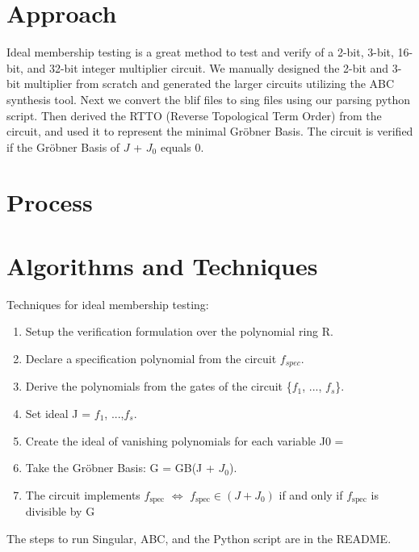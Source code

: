 \documentclass[conference]{IEEEtran}
\begin{document}
\section{Approach}
Ideal membership testing is a great method to test and verify of a 2-bit, 3-bit, 16-bit, and 32-bit integer multiplier circuit.
We manually designed the 2-bit and 3-bit multiplier from scratch and generated the larger circuits utilizing the ABC synthesis tool. Next we
convert the blif files to sing files using our parsing python script. Then derived the RTTO (Reverse Topological Term Order) from the circuit, and used it to
represent the minimal Gröbner Basis. The circuit is verified if the Gröbner Basis of $J$ + $J_{0}$ equals 0.

\section{Process}

\section{Algorithms and Techniques}
Techniques for ideal membership testing: 
\begin{enumerate}
    \item Setup the verification formulation over the polynomial ring R. 
    \item Declare a specification polynomial from the circuit $f_{spec}$.
    \item Derive the polynomials from the gates of the circuit \{$f_{1}$, ..., $f_{s}$\}. 
    \item Set ideal J = $f_{1}$, ...,$f_{s}$.     %
    \item Create the ideal of vanishing polynomials for each variable J0 = 
    \item Take the Gröbner Basis: G = GB(J + $J_{0}$).  
    \item The circuit implements \(f_{\text{spec}}\) \(\Longleftrightarrow\) \(f_{\text{spec}} \in (J + J_0)\) if and only if \(f_{\text{spec}}\)
    is divisible by G
\end{enumerate}
The steps to run Singular, ABC, and the Python script are in the README. 
\end{document}
